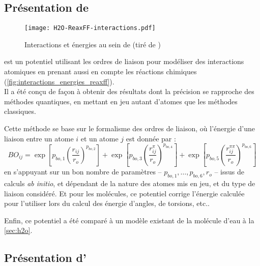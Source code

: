     \subsection{Présentation de \reaxff{}} \label{sec:reaxff}

\begin{figure}[h!]
    \centering
    \texttt{[image: H2O-ReaxFF-interactions.pdf]}
    \caption{Interactions et énergies au sein de \reaxff{} (tiré de \cite{russo_atomistic-scale_2011})}
    \label{fig:interactions_energies_reaxff}
\end{figure}

\reaxff{}\cite{russo_atomistic-scale_2011}\cite{senftle_reaxff_2016} est un potentiel utilisant les ordres de liaison pour modéliser des interactions atomiques en prenant aussi en compte les réactions chimiques (\autoref{fig:interactions_energies_reaxff}).\\
Il a été conçu de façon à obtenir des résultats dont la précision se rapproche des méthodes quantiques, en mettant en jeu autant d'atomes que les méthodes classiques.

Cette méthode se base sur le formalisme des ordres de liaison, où l'énergie d'une liaison entre un atome $i$ et un atome $j$ est donnée par :
\begin{equation}
    BO_{ij} = \exp \left[p_{bo, 1} \left(\frac{r_{ij}}{r_o}\right)^{p_{bo,2}}\right] + \exp \left[p_{bo,3} \left(\frac{r_{ij}^\pi}{r_o}\right)^{p_{bo,4}}\right] + \exp \left[p_{bo,5} \left(\frac{r_{ij}^{\pi\pi}}{r_o}\right)^{p_{bo,6}}\right]
    \label{eq:ordres_liaisons_reaxff}
\end{equation}
en s'appuyant sur un bon nombre de paramètres -- $p_{bo,1}, \dots, p_{bo,6}, r_o$ -- issus de calculs \textit{ab initio}, et dépendant de la nature des atomes mis en jeu, et du type de liaison considéré. Et pour les molécules, ce potentiel corrige l'énergie calculée pour l'utiliser lors du calcul des énergie d'angles, de torsions, etc..

Enfin, ce potentiel a été comparé à un modèle existant de la molécule d'eau à la \autoref{sec:h2o}.

    \subsection{Présentation d'\echemdid{}} \label{sec:echemdid}

